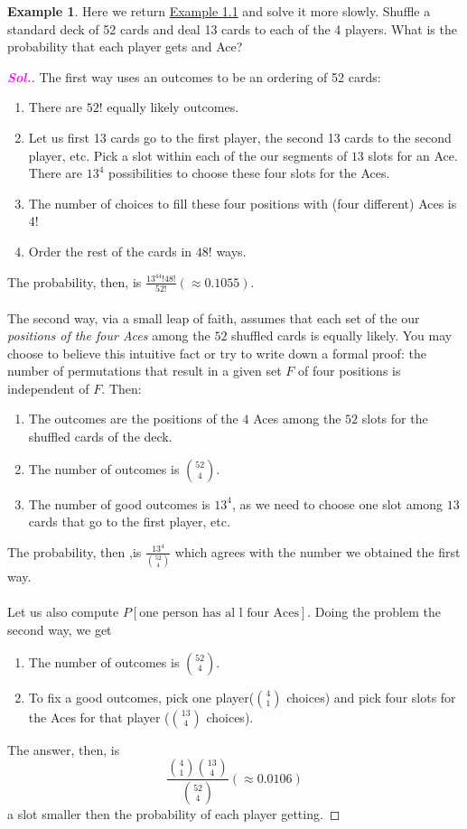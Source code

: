 \documentclass[12pt,a4paper]{article}
\theoremstyle{definition}
\newtheorem{example}{Example}[section]
\theoremstyle{definition}
\theoremstyle{definition}
\theoremstyle{definition}
\theoremstyle{remark}
\theoremstyle{definition}
\newcommand{\dispsty}{\displaystyle}
\newcommand{\sol}{\textcolor{magenta}{\bf \textit{Sol.}}\quad}
\begin{document}
\begin{example}
	Here we return \hyperlink{example1.1}{Example 1.1} and solve it more slowly. Shuffle a standard deck of 52 cards and deal 13 cards to each of the 4 players. What is the probability that each player gets and Ace?\begin{proof}[\sol]
		The first way uses an outcomes to be an ordering of 52 cards:\begin{enumerate}
			\item There are $52!$ equally likely outcomes.
			\item Let us first 13 cards go to the first player, the second 13 cards to the second player, etc. Pick a slot within each of the our segments of $13$ slots for an Ace. There are $13^4$ possibilities to choose these four slots for the Aces.
			\item The number of choices to fill these four positions with (four different) Aces is $4!$
			\item Order the rest of the cards in $48!$ ways.
		\end{enumerate} The probability, then, is $\dispsty\frac{13^44!48!}{52!}(\approx0.1055)$.\\
	\\
	The second way, via a small leap of faith, assumes that each set of the our \textit{positions of the four Aces} among the $52$ shuffled cards is equally likely. You may choose to believe this intuitive fact or try to write down a formal proof: the number of permutations that result in a given set $F$ of four positions is independent of $F$. Then: \begin{enumerate}
		\item The outcomes are the positions of the $4$ Aces among the $52$ slots for the shuffled cards of the deck.
		\item The number of outcomes is $\dispsty\binom{52}{4}$.
		\item The number of good outcomes is $13^4$, as we need to choose one slot among $13$ cards that go to the first player, etc.
	\end{enumerate} The probability, then ,is $\dispsty\frac{\dispsty13^4}{\dispsty\binom{52}{4}}$ which agrees with the number we obtained the first way.\\
\\
Let us also compute $P[\text{one person has al l four Aces}]$. Doing the problem the second way, we get\begin{enumerate}
	\item The number of outcomes is $\dispsty\binom{52}{4}$.
	\item To fix a good outcomes, pick one player($\binom{4}{1}$ choices) and pick four slots for the Aces for that player ($\binom{13}{4}$ choices).
\end{enumerate} The answer, then, is\[
\frac{\dispsty\binom{4}{1}\binom{13}{4}}{\dispsty\binom{52}{4}}(\approx0.0106)
\] a slot smaller then the probability of each player getting.
	\end{proof}
\end{example}
\end{document}
